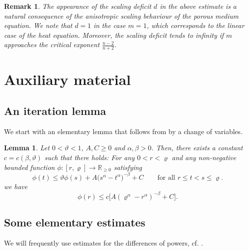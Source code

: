 \documentclass[a4paper, 10pt, american]{amsart}
\newtheorem{lemma}[theorem]{Lemma}
\newtheorem{remark}[theorem]{Remark}
\numberwithin{theorem}{section}
\numberwithin{equation}{section}
\def\R{\mathbb{R}}
\renewcommand{\rho}{\varrho}
\begin{document}
\begin{remark}\upshape
 The appearance of the scaling deficit $d$ in the above estimate is a
 natural consequence of the anisotropic scaling behaviour of the
 porous medium equation. We note that $d=1$ in the case $m=1$, which
 corresponds to the linear case of the heat equation. Moreover, the
 scaling deficit tends to infinity if $m$ approaches the critical
 exponent $\frac{n-2}{n+2}$.  
\end{remark}


























 
\section{Auxiliary material}

\subsection{An iteration lemma}
We start with an elementary lemma that follows from \cite[Lemma~6.1]{Giusti:book} by a change of variables.

\begin{lemma}\label{lem:tech}
Let $0<\vartheta<1$, $A,C\ge 0$ and $\alpha,\beta > 0$. Then, there exists a constant  $c = c(\beta,\vartheta)$ such that there holds: For any $0<r<\rho$ and any non-negative bounded function $\phi\colon [r,\rho]\to\R_{\ge 0}$ satisfying
\begin{equation*}
	\phi(t)
	\le
	\vartheta \phi(s) + A\big (s^\alpha-t^\alpha\big)^{-\beta} + C
	\qquad \text{for all $r\le t<s\le \varrho$.}
\end{equation*}
we have
\begin{equation*}
	\phi(r)
	\le
	c \big[A (\varrho^\alpha - r^\alpha)^{-\beta} + C\big].
\end{equation*}
\end{lemma}


\subsection{Some elementary estimates}
We will frequently use estimates for the differences of powers,
cf. \cite[Lemma 8.3]{Giusti:book}. 
\end{document}
